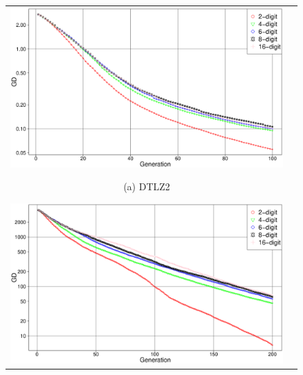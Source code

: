 \documentclass[../main/main]{subfiles}
\begin{document}
\begin{description}
%
%
\begin{figure}[h]
\begin{tabular}{cc}
\begin{minipage}{0.32\hsize}
\includegraphics[width=1\linewidth]{../figures/DTLZ2_GD.eps}
\begin{center}
{\footnotesize (a) DTLZ2}
\end{center}
\end{minipage}
\begin{minipage}{0.32\hsize}
\includegraphics[width=1\linewidth]{../figures/DTLZ3_GD_pre.eps}

\end{minipage}
\end{tabular}
\end{figure}
\end{description}
\end{document}
